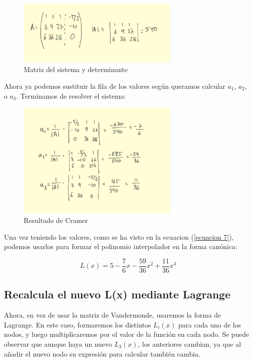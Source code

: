\documentclass{article}
\begin{document}
\begin{figure}[h]
  \center
  \includegraphics[width=0.7\textwidth]{src/vandermonde2_3.jpg}
  \caption{Matriz del sistema y determinante}
\end{figure}

Ahora ya podemos sustituir la fila de los valores según queramos calcular $a_1$, $a_2$, o $a_3$. Terminamos de resolver el sistema:

\begin{figure}[h]
  \center
  \includegraphics[width=0.7\textwidth]{src/vandermonde2_4.jpg}
  \caption{Resultado de Cramer}
\end{figure}

\newpage

Una vez teniendo los valores, como se ha visto en la ecuacion (\ref{ecuacion 7}), podemos usarlos para formar el polinomio interpolador en la forma canónica:

\begin{equation}
  L(x) = 5 - \frac{7}{6}x - \frac{59}{36}x^2 + \frac{11}{36}x^{3}
\end{equation}

\subsection{Recalcula el nuevo L(x) mediante Lagrange}

Ahora, en vez de usar la matriz de Vandermonde, usaremos la forma de Lagrange. En este caso, formaremos los distintos $L_i(x)$ para cada uno de los nodos, y luego multiplicaremos por el valor de la función en cada nodo. Se puede observar que aunque haya un nuevo $L_3(x)$, los anteriores cambian, ya que al añadir el nuevo nodo su expresión para calcular también cambia.
\end{document}
